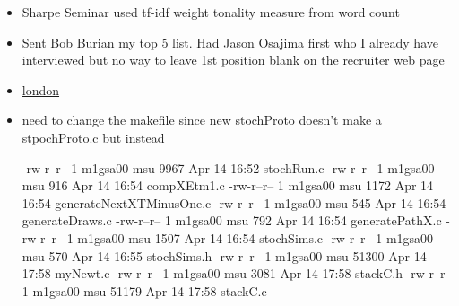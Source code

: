 \documentclass[hyperref]{labbook}
\begin{document}



  \begin{itemize}
  \item Sharpe Seminar used tf-idf weight tonality measure from word count
  \end{itemize}

  \begin{itemize}
  \item Sent Bob Burian my top 5 list.  Had Jason Osajima first who I already  have interviewed  but no way to leave 1st position blank on the  \href{https://fweb.rsma.frb.gov/add/intern_recruiting_2017/cgi-bin/recruiter_view.pl}{recruiter web page }
  \end{itemize}

 \begin{itemize}
 \item \href{https://careers.google.com/jobs#!t=jo&jid=/google/quantitative-analyst-1-13-st-giles-high-st-london-uk-2518841243&}{london}
 \end{itemize}













\begin{itemize}
\item need to change the makefile since new stochProto doesn't make a stpochProto.c but instead 

-rw-r--r-- 1 m1gsa00 msu  9967 Apr 14 16:52 stochRun.c
-rw-r--r-- 1 m1gsa00 msu   916 Apr 14 16:54 compXEtm1.c
-rw-r--r-- 1 m1gsa00 msu  1172 Apr 14 16:54 generateNextXTMinusOne.c
-rw-r--r-- 1 m1gsa00 msu   545 Apr 14 16:54 generateDraws.c
-rw-r--r-- 1 m1gsa00 msu   792 Apr 14 16:54 generatePathX.c
-rw-r--r-- 1 m1gsa00 msu  1507 Apr 14 16:54 stochSims.c
-rw-r--r-- 1 m1gsa00 msu   570 Apr 14 16:55 stochSims.h
-rw-r--r-- 1 m1gsa00 msu 51300 Apr 14 17:58 myNewt.c
-rw-r--r-- 1 m1gsa00 msu  3081 Apr 14 17:58 stackC.h
-rw-r--r-- 1 m1gsa00 msu 51179 Apr 14 17:58 stackC.c

\end{itemize}
\end{document}
